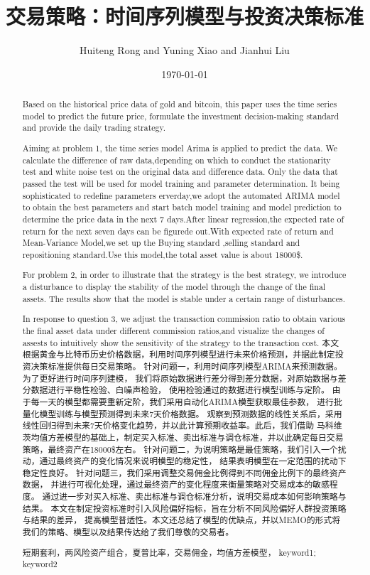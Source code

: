\documentclass{mcmthesis}
\title{交易策略：时间序列模型与投资决策标准}
\author{\small Huiteng Rong and Yuning Xiao and Jianhui Liu}
\date{\today}
\begin{document}
\begin{abstract}
Based on the historical price data of gold and bitcoin, this paper uses the time series model to 
predict the future price, formulate the investment decision-making standard and provide the daily trading strategy.

Aiming at problem 1, the time series model Arima is applied to predict the data.
We calculate the difference of raw data,depending on which to 
 conduct the stationarity test and white noise test on the original data and difference data.
 Only the data that passed the test will be used for model training and parameter determination.
 It being sophisticated to redefine parameters erverday,we adopt the automated ARIMA model to obtain the best parameters 
 and start batch model training and model prediction to determine the price data in the next 7 days.After
 linear regression,the expected rate of return for the next seven days can be figurede out.With expected rate of return and 
 Mean-Variance Model,we set up the Buying standard ,selling standard and repositioning standard.Use this model,the total
 asset value is about 18000\$.

 For problem 2, in order to illustrate that the strategy is the best strategy,
  we introduce a disturbance to display the stability of the model through the change of the final assets. 
  The results show that the model is stable under a certain range of disturbances.
  
  In response to question 3, we adjust the transaction commission ratio to obtain various
  the final asset data under different commission ratios,and visualize the changes of assests to 
  intuitively show the sensitivity of the strategy to the transaction cost.
本文根据黄金与比特币历史价格数据，利用时间序列模型进行未来价格预测，并据此制定投资决策标准提供每日交易策略。
针对问题一，利用时间序列模型ARIMA来预测数据。为了更好进行时间序列建模，
我们将原始数据进行差分得到差分数据，对原始数据与差分数据进行平稳性检验、白噪声检验，
使用检验通过的数据进行模型训练与定阶。
由于每一天的模型都需要重新定阶，我们采用自动化ARIMA模型获取最佳参数，
进行批量化模型训练与模型预测得到未来7天价格数据。
观察到预测数据的线性关系后，采用线性回归得到未来7天价格变化趋势，并以此计算预期收益率。此后，我们借助
马科维茨均值方差模型的基础上，制定买入标准、卖出标准与调仓标准，并以此确定每日交易策略，最终资产在18000\$左右。
针对问题二，为说明策略是最佳策略，我们引入一个扰动，通过最终资产的变化情况来说明模型的稳定性，
结果表明模型在一定范围的扰动下稳定性良好。
针对问题三，我们采用调整交易佣金比例得到不同佣金比例下的最终资产数据，
并进行可视化处理，通过最终资产的变化程度来衡量策略对交易成本的敏感程度。
通过进一步对买入标准、卖出标准与调仓标准分析，说明交易成本如何影响策略与结果。
本文在制定投资标准时引入风险偏好指标，旨在分析不同风险偏好人群投资策略与结果的差异，
提高模型普适性。本文还总结了模型的优缺点，并以MEMO的形式将我们的策略、模型以及结果传达给了我们尊敬的交易者。

\begin{keywords}
短期套利，两风险资产组合，夏普比率，交易佣金，均值方差模型，
keyword1; keyword2


\end{keywords}
\end{abstract}
\end{document}
